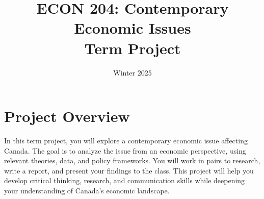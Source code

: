 \documentclass[12pt]{article}
\title{ECON 204: Contemporary Economic Issues \\ Term Project}
\date{Winter 2025}
\begin{document}
\maketitle

\section*{Project Overview}
In this term project, you will explore a contemporary economic issue affecting Canada. The goal is to analyze the issue from an economic perspective, using relevant theories, data, and policy frameworks. You will work in pairs to research, write a report, and present your findings to the class. This project will help you develop critical thinking, research, and communication skills while deepening your understanding of Canada's economic landscape.
\end{document}
